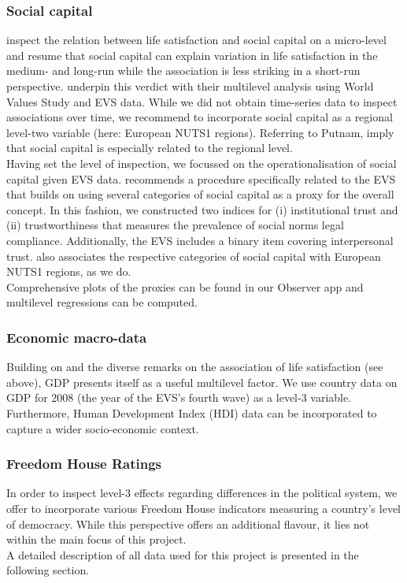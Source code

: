 \documentclass[preprint,12pt,authoryear]{elsarticle}
\begin{document}
\subsubsection{Social capital} 
\citet{bartolini_happy_2014} inspect the relation between life satisfaction and social capital on a micro-level and resume that
social capital can explain variation in life satisfaction in the medium- and long-run while the association is less striking in a
short-run perspective. \citet{mikucka_when_2017} underpin this verdict with their multilevel analysis using World Values Study 
and EVS data. While we did not obtain time-series data to inspect associations over time, we recommend to incorporate 
social capital as a regional level-two variable (here: European NUTS1 regions). Referring to Putnam, \citet{Savelkoul_explaining_2011} imply that social 
capital is especially related to the regional level. \\
Having set the level of inspection, we focussed on the operationalisation of social capital given EVS data. \citet{van_schaik_social_2002}
recommends a procedure specifically related to the EVS that builds on using several categories of social capital as a proxy
for the overall concept. In this fashion, we constructed two indices for (i) institutional trust and (ii) trustworthiness that measures
the prevalence of social norms legal compliance. Additionally, the EVS includes a binary item covering interpersonal trust. \citet{van_schaik_social_2002}
also associates the respective categories of social capital with European NUTS1 regions, as we do. \\
Comprehensive plots of the proxies can be found in our Observer app and multilevel regressions can be computed. 

\subsubsection{Economic macro-data}
Building on \citet{easterlin_does_1974} and the diverse remarks on the association of life satisfaction (see above), GDP presents itself
as a useful multilevel factor. We use country data on GDP for 2008 (the year of the EVS's fourth wave) as a level-3 variable.
Furthermore, Human Development Index (HDI) data can be incorporated to capture a wider socio-economic context. 

\subsubsection{Freedom House Ratings}
In order to inspect level-3 effects regarding differences in the political system, we offer to incorporate various Freedom House 
indicators measuring a country's level of democracy. While this perspective offers an additional flavour, it lies not within the main
focus of this project. \\
A detailed description of all data used for this project is presented in the following section. 	
	
\end{document}

